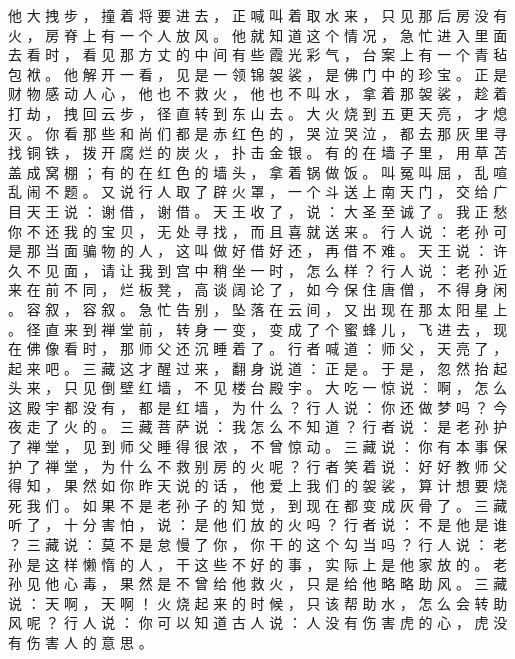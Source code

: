 {他 大 拽 步 ， 撞 着 将 要 进 去 ， 正 喊 叫 着 取 水 来 ， 只 见 那 后 房 没 有 火 ， 房 脊 上 有 一 个 人 放 风 。
他 就 知 道 这 个 情 况 ， 急 忙 进 入 里 面 去 看 时 ， 看 见 那 方 丈 的 中 间 有 些 霞 光 彩 气 ， 台 案 上 有 一 个 青 毡 包 袱 。
他 解 开 一 看 ， 见 是 一 领 锦 袈 裟 ， 是 佛 门 中 的 珍 宝 。
正 是 财 物 感 动 人 心 ， 他 也 不 救 火 ， 他 也 不 叫 水 ， 拿 着 那 袈 裟 ， 趁 着 打 劫 ， 拽 回 云 步 ， 径 直 转 到 东 山 去 。
大 火 烧 到 五 更 天 亮 ， 才 熄 灭 。
你 看 那 些 和 尚 们 都 是 赤 红 色 的 ， 哭 泣 哭 泣 ， 都 去 那 灰 里 寻 找 铜 铁 ， 拨 开 腐 烂 的 炭 火 ， 扑 击 金 银 。
有 的 在 墙 子 里 ， 用 草 苫 盖 成 窝 棚 ； 有 的 在 红 色 的 墙 头 ， 拿 着 锅 做 饭 。
叫 冤 叫 屈 ， 乱 喧 乱 闹 不 题 。
又 说 行 人 取 了 辟 火 罩 ， 一 个 斗 送 上 南 天 门 ， 交 给 广 目 天 王 说 ： 谢 借 ， 谢 借 。
天 王 收 了 ， 说 ： 大 圣 至 诚 了 。
我 正 愁 你 不 还 我 的 宝 贝 ， 无 处 寻 找 ， 而 且 喜 就 送 来 。
行 人 说 ： 老 孙 可 是 那 当 面 骗 物 的 人 ， 这 叫 做 好 借 好 还 ， 再 借 不 难 。
天 王 说 ： 许 久 不 见 面 ， 请 让 我 到 宫 中 稍 坐 一 时 ， 怎 么 样 ？ 行 人 说 ： 老 孙 近 来 在 前 不 同 ， 烂 板 凳 ， 高 谈 阔 论 了 ， 如 今 保 住 唐 僧 ， 不 得 身 闲 。
容 叙 ， 容 叙 。
急 忙 告 别 ， 坠 落 在 云 间 ， 又 出 现 在 那 太 阳 星 上 。
径 直 来 到 禅 堂 前 ， 转 身 一 变 ， 变 成 了 个 蜜 蜂 儿 ， 飞 进 去 ， 现 在 佛 像 看 时 ， 那 师 父 还 沉 睡 着 了 。
行 者 喊 道 ： 师 父 ， 天 亮 了 ， 起 来 吧 。
三 藏 这 才 醒 过 来 ， 翻 身 说 道 ： 正 是 。
于 是 ， 忽 然 抬 起 头 来 ， 只 见 倒 壁 红 墙 ， 不 见 楼 台 殿 宇 。
大 吃 一 惊 说 ： 啊 ， 怎 么 这 殿 宇 都 没 有 ， 都 是 红 墙 ， 为 什 么 ？ 行 人 说 ： 你 还 做 梦 吗 ？ 今 夜 走 了 火 的 。
三 藏 菩 萨 说 ： 我 怎 么 不 知 道 ？ 行 者 说 ： 是 老 孙 护 了 禅 堂 ， 见 到 师 父 睡 得 很 浓 ， 不 曾 惊 动 。
三 藏 说 ： 你 有 本 事 保 护 了 禅 堂 ， 为 什 么 不 救 别 房 的 火 呢 ？ 行 者 笑 着 说 ： 好 好 教 师 父 得 知 ， 果 然 如 你 昨 天 说 的 话 ， 他 爱 上 我 们 的 袈 裟 ， 算 计 想 要 烧 死 我 们 。
如 果 不 是 老 孙 子 的 知 觉 ， 到 现 在 都 变 成 灰 骨 了 。
三 藏 听 了 ， 十 分 害 怕 ， 说 ： 是 他 们 放 的 火 吗 ？ 行 者 说 ： 不 是 他 是 谁 ？ 三 藏 说 ： 莫 不 是 怠 慢 了 你 ， 你 干 的 这 个 勾 当 吗 ？ 行 人 说 ： 老 孙 是 这 样 懒 惰 的 人 ， 干 这 些 不 好 的 事 ， 实 际 上 是 他 家 放 的 。
老 孙 见 他 心 毒 ， 果 然 是 不 曾 给 他 救 火 ， 只 是 给 他 略 略 助 风 。
三 藏 说 ： 天 啊 ， 天 啊 ！ 火 烧 起 来 的 时 候 ， 只 该 帮 助 水 ， 怎 么 会 转 助 风 呢 ？ 行 人 说 ： 你 可 以 知 道 古 人 说 ： 人 没 有 伤 害 虎 的 心 ， 虎 没 有 伤 害 人 的 意 思 。
}
